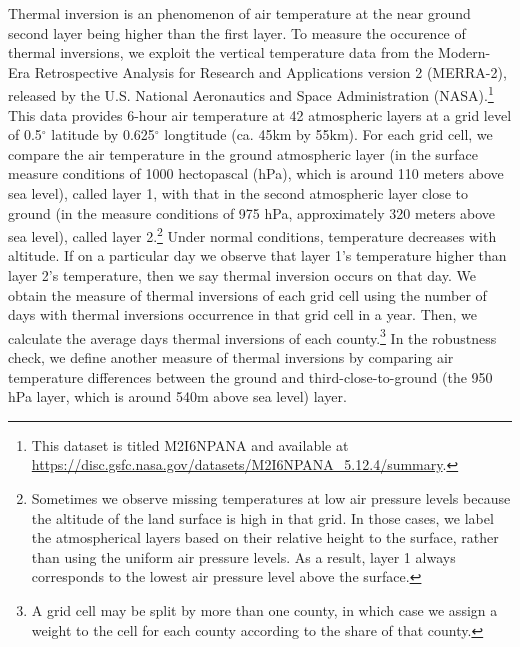 \documentclass[12pt]{article}
\begin{document}
\label{sec:data_TI} Thermal inversion is an phenomenon of air temperature at
the near ground second layer being higher than the first layer. To measure
the occurence of thermal inversions, we exploit the vertical temperature
data from the Modern-Era Retrospective Analysis for Research and
Applications version 2 (MERRA-2), released by the U.S. National Aeronautics and Space Administration (NASA).\footnote{This dataset is titled M2I6NPANA and available at \url{https://disc.gsfc.nasa.gov/datasets/M2I6NPANA_5.12.4/summary}.} This
data provides 6-hour air temperature at 42 atmospheric layers at a grid
level of 0.5${{}^\circ}$ latitude
by 0.625${{}^\circ}$ longtitude
(ca. 45km by 55km). For each grid cell, we compare
the air temperature in the ground atmospheric layer (in the surface measure
conditions of 1000 hectopascal (hPa), which is around 110
meters above sea level), called layer 1, with that in the second atmospheric
layer close to ground (in the measure conditions of 975 hPa, approximately
320 meters above sea level), called layer 2.\footnote{%
Sometimes we observe missing temperatures at low air pressure levels because
the altitude of the land surface is high in that grid. In those cases, we
label the atmospherical layers based on their relative height to the surface,
rather than using the uniform air pressure levels. As a result, layer 1
always corresponds to the lowest air pressure level above the surface.}
Under normal conditions, temperature decreases with altitude. If on a
particular day we observe that layer 1's temperature higher than layer 2's
temperature, then we say thermal inversion occurs on that day. We obtain
the measure of thermal inversions of each grid cell using the number of days
with thermal inversions occurrence in that grid cell in a year. Then, we calculate the average days thermal inversions of each county.\footnote{A grid cell may be split by more than one county, in which case
 we assign a weight to the cell for each
county according to the share of that county.
} In the robustness check, we define another
measure of thermal inversions by comparing air temperature differences
between the ground and third-close-to-ground (the 950 hPa layer, which is
around 540m above sea level) layer.
\end{document}
